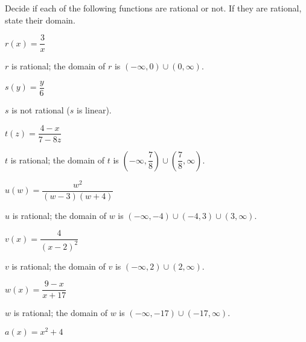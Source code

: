 \begin{exercises}
\begin{problem}
Decide if each of the following functions are rational or not. If 
they are rational, state their domain.
\begin{multicols}{3}
	\begin{subproblem}
		$r(x)=\dfrac{3}{x}$    
		\begin{shortsolution}
			$r$ is rational; the domain of $r$ is $(-\infty,0)\cup (0,\infty)$.
		\end{shortsolution}
	\end{subproblem}
	\begin{subproblem}
		$s(y)=\dfrac{y}{6}$    
		\begin{shortsolution}
			$s$ is not rational ($s$ is linear). 
		\end{shortsolution}
	\end{subproblem}
	\begin{subproblem}
		$t(z)=\dfrac{4-x}{7-8z}$    
		\begin{shortsolution}
			$t$ is rational; the domain of $t$ is $\left( -\infty,\dfrac{7}{8} \right)\cup \left( \dfrac{7}{8},\infty \right)$.
		\end{shortsolution}
	\end{subproblem}
	\begin{subproblem}
		$u(w)=\dfrac{w^2}{(w-3)(w+4)}$ 
		\begin{shortsolution}
			$u$ is rational; the domain of $w$ is $(-\infty,-4)\cup(-4,3)\cup(3,\infty)$. 
		\end{shortsolution}
	\end{subproblem}
	\begin{subproblem}
		$v(x)=\dfrac{4}{(x-2)^2}$ 
		\begin{shortsolution}
			$v$ is rational; the domain of $v$ is $(-\infty,2)\cup(2,\infty)$. 
		\end{shortsolution}
	\end{subproblem}
	\begin{subproblem}
		$w(x)=\dfrac{9-x}{x+17}$ 
		\begin{shortsolution}
			$w$ is rational; the domain of $w$ is $(-\infty,-17)\cup(-17,\infty)$. 
		\end{shortsolution}
	\end{subproblem}
	\begin{subproblem}
		$a(x)=x^2+4$ 
		\begin{shortsolution}

\end{shortsolution}
\end{subproblem}
\end{multicols}
\end{problem}
\end{exercises}
